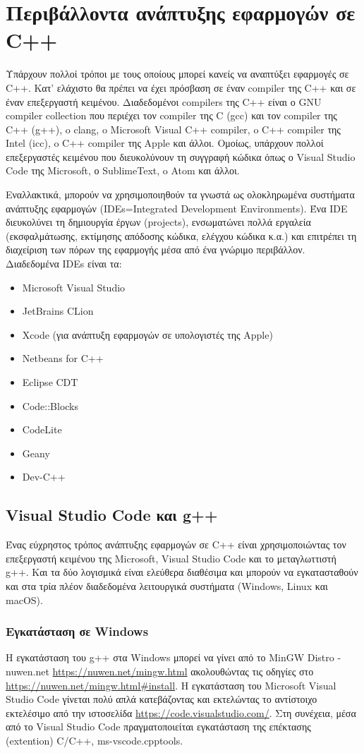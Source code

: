 \section*{Περιβάλλοντα ανάπτυξης εφαρμογών σε C++}
Υπάρχουν πολλοί τρόποι με τους οποίους μπορεί κανείς να αναπτύξει εφαρμογές σε C++. Κατ' ελάχιστο θα πρέπει να έχει πρόσβαση σε έναν compiler της C++ και σε έναν επεξεργαστή κειμένου. Διαδεδομένοι compilers της C++ είναι ο GNU compiler collection που περιέχει τον compiler της C (gcc) και τον compiler της C++ (g++), o clang, o Microsoft Visual C++ compiler, o C++ compiler της Intel (icc), o C++ compiler της Apple και άλλοι. Ομοίως, υπάρχουν πολλοί επεξεργαστές κειμένου που διευκολύνουν τη συγγραφή κώδικα όπως ο Visual Studio Code της Microsoft, ο SublimeText, o Atom και άλλοι.

Εναλλακτικά, μπορούν να χρησιμοποιηθούν τα γνωστά ως ολοκληρωμένα συστήματα ανάπτυξης εφαρμογών (IDEs=Integrated Development Environments). Ένα IDE διευκολύνει τη δημιουργία έργων (projects), ενσωματώνει πολλά εργαλεία (εκσφαλμάτωσης, εκτίμησης απόδοσης κώδικα, ελέγχου κώδικα κ.α.) και επιτρέπει τη διαχείριση των πόρων της εφαρμογής μέσα από ένα γνώριμο περιβάλλον. Διαδεδομένα IDEs είναι τα:
\begin{itemize}
\item Microsoft Visual Studio
\item JetBrains CLion
\item Xcode (για ανάπτυξη εφαρμογών σε υπολογιστές της Apple)
\item Netbeans for C++
\item Eclipse CDT
\item Code::Blocks
\item CodeLite
\item Geany 
\item Dev-C++
\end{itemize}  

\subsection*{Visual Studio Code και g++}
Ένας εύχρηστος τρόπος ανάπτυξης εφαρμογών σε C++ είναι χρησιμοποιώντας τον επεξεργαστή κειμένου της Microsoft, Visual Studio Code και το μεταγλωττιστή g++. Και τα δύο λογισμικά είναι ελεύθερα διαθέσιμα και μπορούν να εγκατασταθούν και στα τρία πλέον διαδεδομένα λειτουργικά συστήματα (Windows, Linux και macOS).   

\subsubsection*{Εγκατάσταση σε Windows}
Η εγκατάσταση του g++ στα Windows μπορεί να γίνει από το MinGW Distro - nuwen.net \href{https://nuwen.net/mingw.html}{https://nuwen.net/mingw.html} ακολουθώντας τις οδηγίες στο \href{https://nuwen.net/mingw.html#install}{https://nuwen.net/mingw.html#install}. Η εγκατάσταση του Microsoft Visual Studio Code γίνεται πολύ απλά κατεβάζοντας και εκτελώντας το αντίστοιχο εκτελέσιμο από την ιστοσελίδα \href{https://code.visualstudio.com/}{https://code.visualstudio.com/}. Στη συνέχεια, μέσα από το Visual Studio Code πραγματοποιείται εγκατάσταση της επέκτασης (extention) C/C++, ms-vscode.cpptools.

